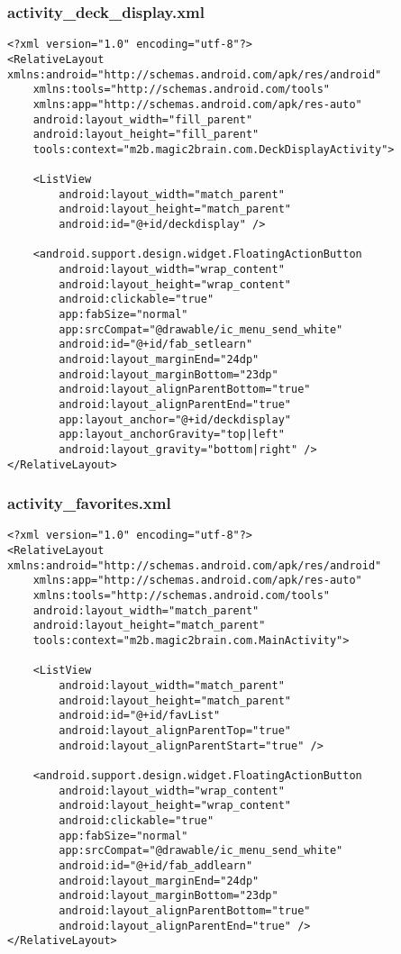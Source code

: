 \subsubsection*{activity\_deck\_display.xml}
\begin{lstlisting}
<?xml version="1.0" encoding="utf-8"?>
<RelativeLayout xmlns:android="http://schemas.android.com/apk/res/android"
    xmlns:tools="http://schemas.android.com/tools"
    xmlns:app="http://schemas.android.com/apk/res-auto"
    android:layout_width="fill_parent"
    android:layout_height="fill_parent"
    tools:context="m2b.magic2brain.com.DeckDisplayActivity">

    <ListView
        android:layout_width="match_parent"
        android:layout_height="match_parent"
        android:id="@+id/deckdisplay" />

    <android.support.design.widget.FloatingActionButton
        android:layout_width="wrap_content"
        android:layout_height="wrap_content"
        android:clickable="true"
        app:fabSize="normal"
        app:srcCompat="@drawable/ic_menu_send_white"
        android:id="@+id/fab_setlearn"
        android:layout_marginEnd="24dp"
        android:layout_marginBottom="23dp"
        android:layout_alignParentBottom="true"
        android:layout_alignParentEnd="true"
        app:layout_anchor="@+id/deckdisplay"
        app:layout_anchorGravity="top|left"
        android:layout_gravity="bottom|right" />
</RelativeLayout>
\end{lstlisting}

\subsubsection*{activity\_favorites.xml}
\begin{lstlisting}
<?xml version="1.0" encoding="utf-8"?>
<RelativeLayout xmlns:android="http://schemas.android.com/apk/res/android"
    xmlns:app="http://schemas.android.com/apk/res-auto"
    xmlns:tools="http://schemas.android.com/tools"
    android:layout_width="match_parent"
    android:layout_height="match_parent"
    tools:context="m2b.magic2brain.com.MainActivity">

    <ListView
        android:layout_width="match_parent"
        android:layout_height="match_parent"
        android:id="@+id/favList"
        android:layout_alignParentTop="true"
        android:layout_alignParentStart="true" />

    <android.support.design.widget.FloatingActionButton
        android:layout_width="wrap_content"
        android:layout_height="wrap_content"
        android:clickable="true"
        app:fabSize="normal"
        app:srcCompat="@drawable/ic_menu_send_white"
        android:id="@+id/fab_addlearn"
        android:layout_marginEnd="24dp"
        android:layout_marginBottom="23dp"
        android:layout_alignParentBottom="true"
        android:layout_alignParentEnd="true" />
</RelativeLayout>
\end{lstlisting}

